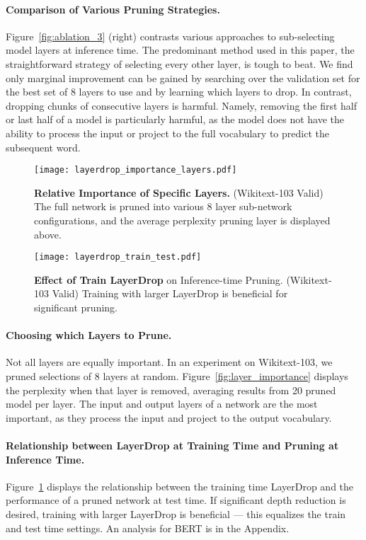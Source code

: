 \paragraph{Comparison of Various Pruning Strategies.}
Figure~\ref{fig:ablation_3} (right) contrasts various approaches to sub-selecting model layers at inference time.
The predominant method used in this paper, the straightforward strategy of selecting every other layer, is tough to beat.
We find only marginal improvement can be gained by searching over the validation set for the best set of 8 layers to use and by learning which layers to drop. In contrast, dropping chunks of consecutive layers is harmful. Namely, removing the first half or last half of a model is particularly harmful, as the model does not have the ability to process the input or project to the full vocabulary to predict the subsequent word.

\begin{figure}[t]
    \centering
    \begin{minipage}[t]{.55\linewidth}
        \texttt{[image: layerdrop\_importance\_layers.pdf]}
        \caption{\textbf{Relative Importance of Specific Layers.} (Wikitext-103 Valid) The full network is pruned into various 8 layer sub-network configurations, and the average perplexity pruning layer  is displayed above.}
    \label{fig:layer_importance}
    \end{minipage}
\hfill
    \centering
    \begin{minipage}[t]{.41\linewidth}
        \texttt{[image: layerdrop\_train\_test.pdf]}
        \caption{\textbf{Effect of Train LayerDrop} on Inference-time Pruning. (Wikitext-103 Valid) Training with larger LayerDrop is beneficial for significant pruning.}
    \label{fig:lm_layerdrop_train}
    \end{minipage}
\end{figure}


\paragraph{Choosing which Layers to Prune.}

Not all layers are equally important.  In an experiment on Wikitext-103, we pruned selections of 8 layers at random. Figure~\ref{fig:layer_importance} displays the perplexity when that layer is removed, averaging results from 20 pruned model per layer. The input and output layers of a network are the most important, as they process the input and project to the output vocabulary.

\paragraph{Relationship between LayerDrop at Training Time and Pruning at Inference Time.}

Figure~\ref{fig:lm_layerdrop_train} displays the relationship between the training time LayerDrop and the performance of a pruned network at test time. If significant depth reduction is desired, training with larger LayerDrop is beneficial --- this equalizes the train and test time settings. An analysis for BERT is in the Appendix.
